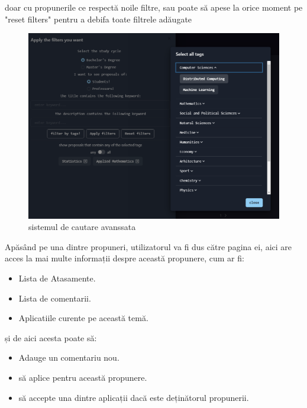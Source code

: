 \documentclass[12pt,a4paper,hidelinks]{report}
\theoremstyle{definition}
\theoremstyle{remark}
\begin{document}
    doar cu propunerile ce respectă noile filtre, sau poate să apese la orice moment pe "reset filters" pentru a debifa toate filtrele adăugate
\begin{figure}[H]
    \centering
    \includegraphics[scale=0.5]{images/advancedSearch.PNG}
    \caption{sistemul de cautare avanssata}
\end{figure}
Apăsând pe una dintre propuneri, utilizatorul va fi dus către pagina ei, aici are acces la mai multe informații despre această propunere, cum ar fi:
\begin{itemize}
    \item Lista de Atasamente.
    \item Lista de comentarii.
    \item Aplicatiile curente pe această temă.
\end{itemize}
și de aici acesta poate să:
\begin{itemize}
    \item Adauge un comentariu nou.
    \item să aplice pentru această propunere.
    \item să accepte una dintre aplicații dacă este deținătorul propunerii.
\end{itemize}
\end{document}
